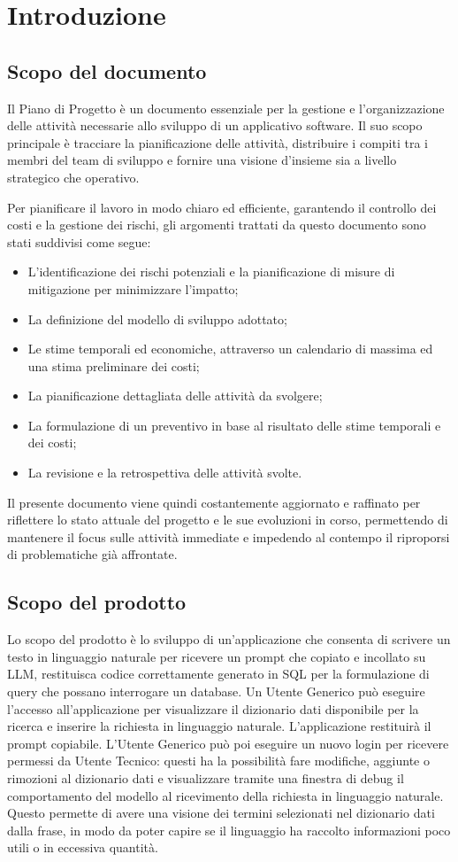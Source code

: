 \section{Introduzione}
\label{sec:introduzione}

\subsection{Scopo del documento}
Il Piano di Progetto è un documento essenziale per la gestione e l'organizzazione delle attività necessarie allo sviluppo di un applicativo software. Il suo scopo principale è tracciare la pianificazione delle attività, distribuire i compiti tra i membri del team di sviluppo e fornire una visione d'insieme sia a livello strategico che operativo.

Per pianificare il lavoro in modo chiaro ed efficiente, garantendo il controllo dei costi e la gestione dei rischi, gli argomenti trattati da questo documento sono stati suddivisi come segue:
\begin{itemize}
  \item L'identificazione dei rischi potenziali e la pianificazione di misure di mitigazione per minimizzare l'impatto;
  \item La definizione del modello di sviluppo adottato;
  \item Le stime temporali ed economiche, attraverso un calendario di massima ed una stima preliminare dei costi;
  \item La pianificazione dettagliata delle attività da svolgere;
  \item La formulazione di un preventivo in base al risultato delle stime temporali e dei costi;
  \item La revisione e la retrospettiva delle attività svolte.
\end{itemize}
Il presente documento viene quindi costantemente aggiornato e raffinato per riflettere lo stato attuale del progetto e le sue evoluzioni in corso, permettendo di mantenere il focus sulle attività immediate e impedendo al contempo il riproporsi di problematiche già affrontate.
\subsection{Scopo del prodotto}
Lo scopo del prodotto è lo sviluppo di un'applicazione che consenta di scrivere un testo in linguaggio naturale per ricevere un prompt che copiato e incollato su LLM, restituisca codice correttamente generato in SQL per la formulazione di query che possano interrogare un database. 
Un Utente Generico può eseguire l'accesso all'applicazione per visualizzare il dizionario dati disponibile per la ricerca e inserire la richiesta in linguaggio naturale. 
L'applicazione restituirà il prompt copiabile. 
L'Utente Generico può poi eseguire un nuovo login per ricevere permessi da Utente Tecnico: questi ha la possibilità fare modifiche, aggiunte o rimozioni al dizionario dati e visualizzare tramite una finestra di debug il comportamento del modello al ricevimento della richiesta in linguaggio naturale. 
Questo permette di avere una visione dei termini selezionati nel dizionario dati dalla frase, in modo da poter capire se il linguaggio ha raccolto informazioni poco utili o in eccessiva quantità.
